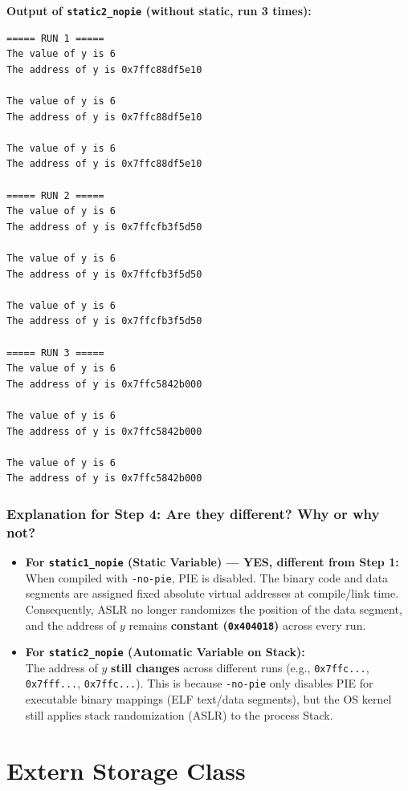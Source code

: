 \documentclass[12pt,a4paper]{article}
\begin{document}
\textbf{Output of \texttt{static2\_nopie} (without static, run 3 times):}
\begin{lstlisting}[style=outstyle]
===== RUN 1 =====
The value of y is 6
The address of y is 0x7ffc88df5e10

The value of y is 6
The address of y is 0x7ffc88df5e10

The value of y is 6
The address of y is 0x7ffc88df5e10

===== RUN 2 =====
The value of y is 6
The address of y is 0x7ffcfb3f5d50

The value of y is 6
The address of y is 0x7ffcfb3f5d50

The value of y is 6
The address of y is 0x7ffcfb3f5d50

===== RUN 3 =====
The value of y is 6
The address of y is 0x7ffc5842b000

The value of y is 6
The address of y is 0x7ffc5842b000

The value of y is 6
The address of y is 0x7ffc5842b000
\end{lstlisting}

\subsubsection*{Explanation for Step 4: Are they different? Why or why not?}
\begin{itemize}
    \item \textbf{For \texttt{static1\_nopie} (Static Variable) --- YES, different from Step 1:} \\
    When compiled with \texttt{-no-pie}, PIE is disabled. The binary code and data segments are assigned fixed absolute virtual addresses at compile/link time. Consequently, ASLR no longer randomizes the position of the data segment, and the address of $y$ remains \textbf{constant (\texttt{0x404018})} across every run.
    \item \textbf{For \texttt{static2\_nopie} (Automatic Variable on Stack):} \\
    The address of $y$ \textbf{still changes} across different runs (e.g., \texttt{0x7ffc...}, \texttt{0x7fff...}, \texttt{0x7ffc...}). This is because \texttt{-no-pie} only disables PIE for executable binary mappings (ELF text/data segments), but the OS kernel still applies stack randomization (ASLR) to the process Stack.
\end{itemize}

\newpage
\section{Extern Storage Class}
\end{document}
